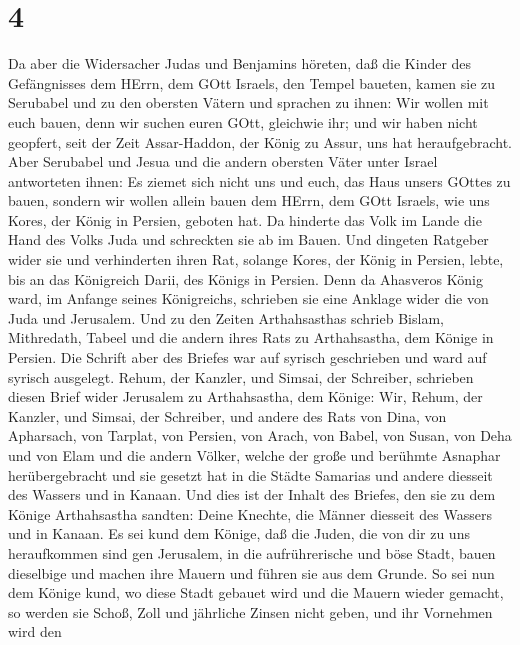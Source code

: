 \hypertarget{section-3}{%
\section{4}\label{section-3}}

 Da aber die Widersacher Judas und Benjamins höreten, daß
die Kinder des Gefängnisses dem HErrn, dem GOtt Israels, den Tempel
baueten,  kamen sie zu Serubabel und zu den obersten Vätern
und sprachen zu ihnen: Wir wollen mit euch bauen, denn wir suchen euren
GOtt, gleichwie ihr; und wir haben nicht geopfert, seit der Zeit
Assar-Haddon, der König zu Assur, uns hat heraufgebracht. 
Aber Serubabel und Jesua und die andern obersten Väter unter Israel
antworteten ihnen: Es ziemet sich nicht uns und euch, das Haus unsers
GOttes zu bauen, sondern wir wollen allein bauen dem HErrn, dem GOtt
Israels, wie uns Kores, der König in Persien, geboten hat. 
Da hinderte das Volk im Lande die Hand des Volks Juda und schreckten sie
ab im Bauen.  Und dingeten Ratgeber wider sie und
verhinderten ihren Rat, solange Kores, der König in Persien, lebte, bis
an das Königreich Darii, des Königs in Persien.  Denn da
Ahasveros König ward, im Anfange seines Königreichs, schrieben sie eine
Anklage wider die von Juda und Jerusalem.  Und zu den Zeiten
Arthahsasthas schrieb Bislam, Mithredath, Tabeel und die andern ihres
Rats zu Arthahsastha, dem Könige in Persien. Die Schrift aber des
Briefes war auf syrisch geschrieben und ward auf syrisch ausgelegt.
 Rehum, der Kanzler, und Simsai, der Schreiber, schrieben
diesen Brief wider Jerusalem zu Arthahsastha, dem Könige: 
Wir, Rehum, der Kanzler, und Simsai, der Schreiber, und andere des Rats
von Dina, von Apharsach, von Tarplat, von Persien, von Arach, von Babel,
von Susan, von Deha und von Elam  und die andern Völker,
welche der große und berühmte Asnaphar herübergebracht und sie gesetzt
hat in die Städte Samarias und andere diesseit des Wassers und in
Kanaan.  Und dies ist der Inhalt des Briefes, den sie zu
dem Könige Arthahsastha sandten: Deine Knechte, die Männer diesseit des
Wassers und in Kanaan.  Es sei kund dem Könige, daß die
Juden, die von dir zu uns heraufkommen sind gen Jerusalem, in die
aufrührerische und böse Stadt, bauen dieselbige und machen ihre Mauern
und führen sie aus dem Grunde.  So sei nun dem Könige kund,
wo diese Stadt gebauet wird und die Mauern wieder gemacht, so werden sie
Schoß, Zoll und jährliche Zinsen nicht geben, und ihr Vornehmen wird den

